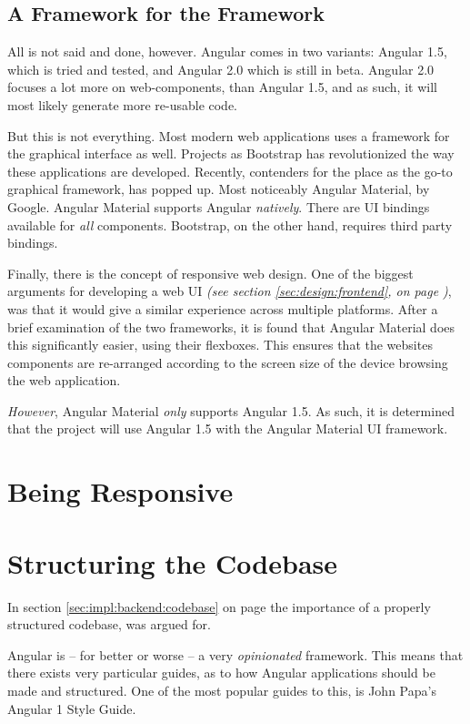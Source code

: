		\subsection{A Framework for the Framework}
			All is not said and done, however. Angular comes in two variants: Angular 1.5, which is tried and tested, and Angular 2.0 which is still in beta. Angular 2.0 focuses a lot more on web-components, than Angular 1.5, and as such, it will most likely generate more re-usable code. 

			But this is not everything. Most modern web applications uses a framework for the graphical interface as well. Projects as Bootstrap has revolutionized the way these applications are developed. Recently, contenders for the place as the go-to graphical framework, has popped up. Most noticeably Angular Material, by Google. Angular Material supports Angular \emph{natively}. There are UI bindings available for \emph{all} components. Bootstrap, on the other hand, requires third party bindings. 

			Finally, there is the concept of responsive web design. One of the biggest arguments for developing a web UI \emph{(see section \ref{sec:design:frontend}, on page \pageref{sec:design:frontend})}, was that it would give a similar experience across multiple platforms. After a brief examination of the two frameworks, it is found that Angular Material does this significantly easier, using their flexboxes. This ensures that the websites components are re-arranged according to the screen size of the device browsing the web application.

			\emph{However}, Angular Material \emph{only} supports Angular 1.5. As such, it is determined that the project will use Angular 1.5 with the Angular Material UI framework.



	\section{Being Responsive}


	\section{Structuring the Codebase}
		In section \ref{sec:impl:backend:codebase} on page \pageref{sec:impl:backend:codebase} the importance of a properly structured codebase, was argued for. 

		Angular is -- for better or worse -- a very \emph{opinionated} framework. This means that there exists very particular guides, as to how Angular applications should be made and structured. One of the most popular guides to this, is John Papa's Angular 1 Style Guide\cite{johnpapa_angular1}.

